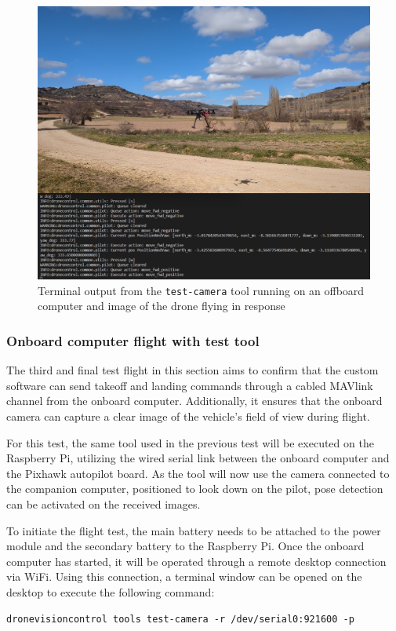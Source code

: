 \begin{figure}
  \centering
  \includegraphics[width=\textwidth, keepaspectratio]{img/video-field-test-offboard.png}
  \caption{Terminal output from the \texttt{test-camera} tool running on an offboard computer and image of the drone flying in response}
  \label{fig:flight-test-cam-offboard}
\end{figure}

\subsubsection{Onboard computer flight with test tool}
\label{subsec:fl-test-3}


The third and final test flight in this section aims to confirm that the custom software can send takeoff and landing commands through a cabled MAVlink channel from the onboard computer. Additionally, it ensures that the onboard camera can capture a clear image of the vehicle's field of view during flight.

For this test, the same tool used in the previous test will be executed on the Raspberry Pi, utilizing the wired serial link between the onboard computer and the Pixhawk autopilot board. As the tool will now use the camera connected to the companion computer, positioned to look down on the pilot, pose detection can be activated on the received images.


To initiate the flight test, the main battery needs to be attached to the power module and the secondary battery to the Raspberry Pi. Once the onboard computer has started, it will be operated through a remote desktop connection via WiFi. Using this connection, a terminal window can be opened on the desktop to execute the following command:
\begin{verbatim}
dronevisioncontrol tools test-camera -r /dev/serial0:921600 -p
\end{verbatim}


